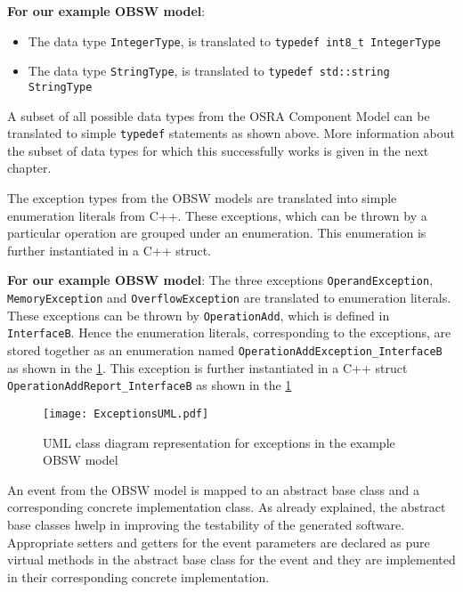 \textbf{For our example OBSW model}:
\begin{itemize}
\item The data type \texttt{IntegerType}, is translated to \texttt{typedef\allowbreak \ int8\_t IntegerType}
\item The data type \texttt{StringType}, is translated to \texttt{typedef\allowbreak \ std::string StringType} 
\end{itemize}

A subset of all possible data types from the OSRA Component Model can be translated to simple \texttt{typedef} statements as shown above. More information about the subset of data types for which this successfully works is given in the next chapter. 

The exception types from the OBSW models are translated into simple enumeration literals from C++. These exceptions, which can be thrown by a particular operation are grouped under an enumeration. This enumeration is further instantiated in a C++ struct.

\textbf{For our example OBSW model}: The three exceptions \texttt{Operand\allowbreak Exception}, \texttt{Memory\allowbreak Exception} and \texttt{Overflow\allowbreak Exception} are translated to enumeration literals. These exceptions can be thrown by \texttt{OperationAdd}, which is defined in \texttt{InterfaceB}. Hence the enumeration literals, corresponding to the exceptions, are stored together as an enumeration named \texttt{OperationAdd\allowbreak Exception\allowbreak\_InterfaceB} as shown in the \cref{fig: ExceptionsUML}. This exception is further instantiated in a C++ struct \texttt{OperationAdd\allowbreak Report\allowbreak\_InterfaceB} as shown in the \cref{fig: ExceptionsUML} 

\begin{figure}[h]
	\centering
	\texttt{[image: ExceptionsUML.pdf]}
	\caption{UML class diagram representation for exceptions in the example OBSW model}
	\label{fig: ExceptionsUML}
\end{figure}

An event from the OBSW model is mapped to an abstract base class and a corresponding concrete implementation class. As already explained, the abstract base classes hwelp in improving the testability of the generated software. Appropriate setters and getters for the event parameters are declared as pure virtual methods in the abstract base class for the event and they are implemented in their corresponding concrete implementation.

